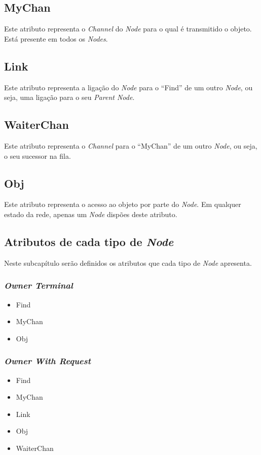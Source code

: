 \subsection*{MyChan}
\label{especificacao:atr:mychan}
    Este atributo representa o \emph{Channel} do \emph{Node} para o qual é transmitido o objeto.
    Está presente em todos os \emph{Nodes}.

\subsection*{Link}
\label{especificacao:atr:link}
Este atributo representa a ligação do \emph{Node} para o ``Find'' de um outro \emph{Node}, ou seja, uma ligação para o seu \emph{Parent Node}.

\subsection*{WaiterChan}
\label{especificacao:atr:waiterchan}
    Este atributo representa o \emph{Channel} para o ``MyChan'' de um outro \emph{Node}, ou seja, o seu sucessor na fila.

\subsection*{Obj}
\label{especificacao:atr:obj}
    Este atributo representa o acesso ao objeto por parte do \emph{Node}.
    Em qualquer estado da rede, apenas um \emph{Node} dispões deste atributo.


\subsection*{Atributos de cada tipo de \emph{Node}}
Neste subcapítulo serão definidos os atributos que cada tipo de \emph{Node} apresenta.


\subsubsection*{\emph{Owner Terminal}}
\begin{itemize}
    \item Find
    \item MyChan
    \item Obj
\end{itemize}
\subsubsection*{\emph{Owner With Request}}
\begin{itemize}
    \item Find
    \item MyChan
    \item Link
    \item Obj
    \item WaiterChan
\end{itemize}
